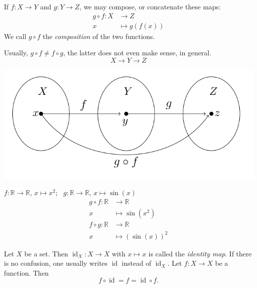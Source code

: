 


\begin{Definition}{}
If $f:X \to Y$ and $g : Y\to Z$, we may compose, or concatenate these maps:
\begin{align*}
 g \circ f : X &\to  Z\\
            x &\mapsto g(f(x))
\end{align*}
We call $g \circ f$ the \emph{composition} of the two functions.
\end{Definition}

Usually, $g\circ f \neq f\circ g$, the latter does not even make sense, in general. 
\[
 X \to Y \to Z
\]

\includegraphics{./comp.png}

\begin{example}{} \label{Bsp:Komposition}
\item $f: \mathbb{R} \rightarrow \mathbb{R}$, $x\mapsto x^2$;~ $g:\mathbb{R} \rightarrow \mathbb{R}$, $x\mapsto \sin(x)$
\begin{align*}
g\circ f: \mathbb{R} &\rightarrow \mathbb{R} \\
x &\mapsto \sin(x^2) \\
f\circ g: \mathbb{R} &\rightarrow \mathbb{R} \\
x &\mapsto (\sin(x))^2
\end{align*}
\item Let $X$ be a set. Then $\operatorname{id}_X: X\rightarrow X$ with $x\mapsto x$ is called the \emph{identity map}.
If there is no confusion, one usually writes $\operatorname{id}$ instead of $\operatorname{id}_X$. 
Let $f: X\rightarrow X$ be a function. Then
\[
    f\circ \operatorname{id}=f=\operatorname{id}\circ f.
\]
\end{example}

